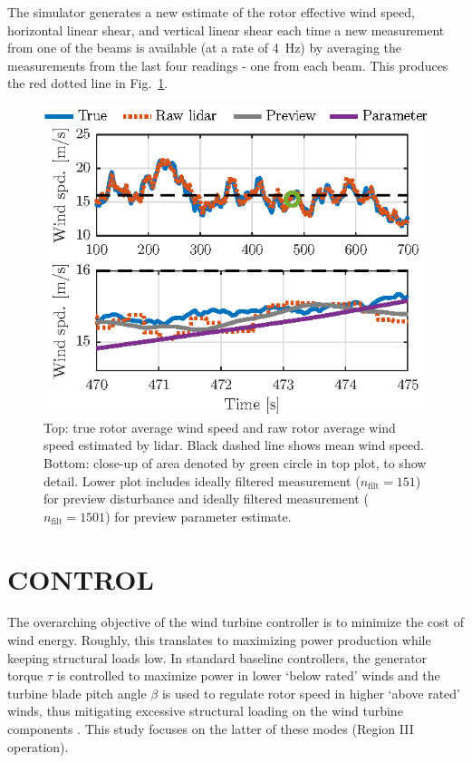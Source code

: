 \documentclass[letterpaper, 10 pt, conference]{ieeeconf}  %
\begin{document}
The simulator generates a new estimate of the rotor effective wind speed, horizontal linear shear, and vertical linear shear each time a new measurement from one of the beams is available (at a rate of 4~Hz) by averaging the measurements from the last four readings - one from each beam. This produces the red dotted line in Fig.~\ref{fig:lidarmeas}.
\begin{figure}[thbp]
	\centering
	\includegraphics[trim=0 0 0 -5 , clip, scale=1.0]{LidarMeas.eps}
	\caption{Top: true rotor average wind speed and raw rotor average wind speed estimated by lidar. Black dashed line shows mean wind speed. Bottom: close-up of area denoted by green circle in top plot, to show detail. Lower plot includes ideally filtered measurement ($n_\mathrm{filt} = 151$) for preview disturbance and ideally filtered measurement ($n_\mathrm{filt} = 1501$) for preview parameter estimate.}
	\label{fig:lidarmeas}
\end{figure}

\section{CONTROL}\label{sec:Control}
The overarching objective of the wind turbine controller is to minimize the cost of wind energy. Roughly, this translates to maximizing power production while keeping structural loads low. In standard baseline controllers, the generator torque $\tau$ is controlled to maximize power in lower `below rated' winds and the turbine blade pitch angle $\beta$ is used to regulate rotor speed in higher `above rated' winds, thus mitigating excessive structural loading on the wind turbine components \cite{Pao2011CSM}. This study focuses on the latter of these modes (Region III operation). %
\end{document}
